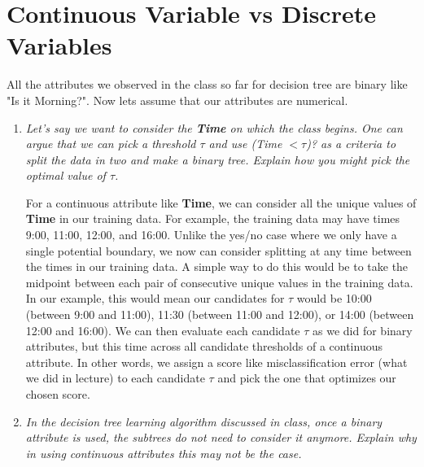 \documentclass[fleqn]{article}
\begin{document}
\section{Continuous Variable vs Discrete Variables}
All the attributes we observed in the class so far for decision tree are binary like "Is it Morning?". Now lets assume that our attributes are numerical.
\begin{enumerate}
	\item \textit{Let's say we want to consider the \textbf{Time} on which the class begins. One can argue that we can pick a threshold $\tau$ and use (Time $< \tau$)? as a criteria to split the data in two and make a binary tree. Explain how you might pick the optimal value of $\tau$.}

	      For a continuous attribute like \textbf{Time}, we can consider all the unique values of \textbf{Time} in our training data.
	      For example, the training data may have times 9:00, 11:00, 12:00, and 16:00.
	      Unlike the yes/no case where we only have a single potential boundary, we now can consider splitting at any time between the times in our training data.
	      A simple way to do this would be to take the midpoint between each pair of consecutive unique values in the training data.
	      In our example, this would mean our candidates for $\tau$ would be 10:00 (between 9:00 and 11:00), 11:30 (between 11:00 and 12:00), or 14:00 (between 12:00 and 16:00).
	      We can then evaluate each candidate $\tau$ as we did for binary attributes, but this time across all candidate thresholds of a continuous attribute.
	      In other words, we assign a score like misclassification error (what we did in lecture) to each candidate $\tau$ and pick the one that optimizes our chosen score.

	\item \textit{In the decision tree learning algorithm discussed in class, once a binary attribute is used, the subtrees do not need to consider it anymore. Explain why in using continuous attributes this may not be the case.}


\end{enumerate}
\end{document}
